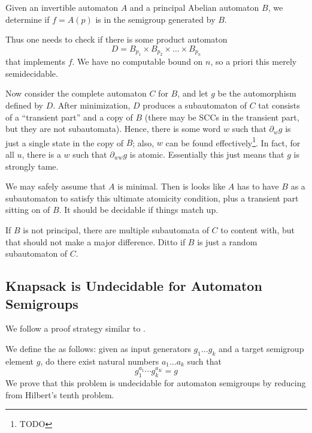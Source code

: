 \documentclass[11pt]{article}
\begin{document}

Given an invertible automaton $A$ and a principal Abelian automaton
$B$, we determine if $f = A(p)$ is in the semigroup generated by $B$.

Thus one needs to check if there is some product automaton
\[
  D = B_{p_1} \times B_{p_2} \times \ldots \times B_{p_n}
\]
that implements $f$. We have no computable bound on $n$, so a priori
this merely semidecidable.

Now consider the complete automaton $C$ for $B$, and let $g$ be the
automorphism defined by $D$. After minimization, $D$ produces a
subautomaton of $C$ tat consists of a ``transient part'' and a copy of
$B$ (there may be SCCs in the transient part, but they are not
subautomata). Hence, there is some word $w$ such that $\partial_w g$
is just a single state in the copy of $B$; also, $w$ can be found
effectively\footnote{TODO}. In fact, for all $u$, there is a $w$ such
that $\partial_{ww}g$ is atomic. Essentially this just means that $g$
is strongly tame.

We may safely assume that $A$ is minimal. Then is looks like $A$ has
to have $B$ as a subautomaton to satisfy this ultimate atomicity
condition, plus a transient part sitting on of $B$. It should be
decidable if things match up.

If $B$ is not principal, there are multiple subautomata of $C$ to
content with, but that should not make a major difference. Ditto if
$B$ is just a random subautomaton of $C$.

%

\subsection{Knapsack is Undecidable for Automaton Semigroups}
We follow a proof strategy similar to \cite{Konig15:knapsack}.

We define the  as follows: given as input
generators $g_1 \ldots g_k$ and a target semigroup element $g$, do there
exist natural numbers $a_1\ldots a_k$ such that
\[ g_1^{a_1} \cdots g_k^{a_K} = g \] We prove that this problem is
undecidable for automaton semigroups by reducing from %
Hilbert's tenth problem.
\end{document}
